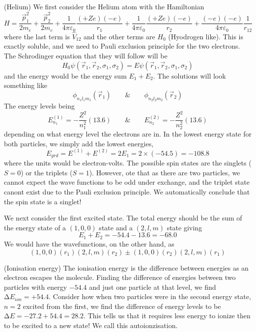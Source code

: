 \vspace{2ex}
\begin{thm}
(Helium) We first consider the Helium atom with the Hamiltonian
\[H=\dfrac{\vec{p}_{1}^2}{2m_{e}}+\dfrac{\vec{p}_{2}^2}{2m_{e}}+\dfrac{1}{4\pi \varepsilon _{0}}\dfrac{(+Ze)(-e)}{r_1}+\dfrac{1}{4\pi\varepsilon _{0}}\dfrac{(+Ze)(-e)}{r_{2}}+\dfrac{(-e)(-e)}{4\pi \varepsilon _{0}}\dfrac{1}{r_{12}}\]
where the last term is $\hat{V}_{12}$ and the other terms are $H_0$ (Hyodrogen like). This is exactly soluble, and we need to Pauli exclusion principle for the two electrons. The Schrodinger equation that they will follow will be
\[H_0\psi (\vec{r}_{1},\vec{r}_{2},\sigma_{1},\sigma_{2})=E\psi (\vec{r}_{1},\vec{r}_{2},\sigma_{1},\sigma_{2})\]
and the energy would be the energy sum $E_1+E_2$. The solutions will look something like
\[\phi _{n_1l_1m_1}(\vec{r}_{1})\qquad\&\qquad \phi _{n_2l_2m_2}(\vec{r}_{2})\]
The energy levels being
\[E_{n_1}^{(1)}=-\dfrac{Z^2}{n_1^2}(13.6)\qquad\&\qquad E^{(2)}_{n_{2}}=-\dfrac{Z^2}{n_{2}^2}(13.6)\]
depending on what energy level the electrons are in. In the lowest energy state for both particles, we simply add the lowest energies,
\[E_{grd}=E^{(1)}+E^{(2)}=2E_{1}=2\times (-54.5)=-108.8\]
where the units would be electron-volts. The possible spin states are the singlets ($S=0$) or the triplets ($S=1$). However, ote that as there are two particles, we cannot expect the wave functions to be odd under exchange, and the triplet state canont exist due to the Pauli exclusion principle. We automatically conclude that the spin state is a singlet! 

\bigskip

We next consider the first excited state. The total energy should be the sum of the energy state of a $(1,0,0)$ state and a $(2,l,m)$ state giving
\[E_1+E_2=-54.4-13.6=-68.0\]
We would have the wavefunctions, on the other hand, as 
\[(1,0,0)(r_1)(2,l,m)(r_2)\pm (1,0,0)(r_2)(2,l,m)(r_1)\]
\end{thm}
\vspace{2ex}
\begin{defi}
(Ionisation energy) The ionisation energy is the difference between energies as an electron escapes the molecule. Finding the difference of energies between two particles with energy $-54.4$ and just one particle at that level, we find $\mathrm{\Delta }E_{ion}=+54.4$. Consider how when two particles were in the second energy state, $n=2$ excited from the first, we find the difference of energy levels to be $\mathrm{\Delta }E=-27.2+54.4=28.2$. This tells us that it requires less energy to ionize then to be excited to a new state! We call this autoionzisation.
\end{defi}
\vspace{2ex}

